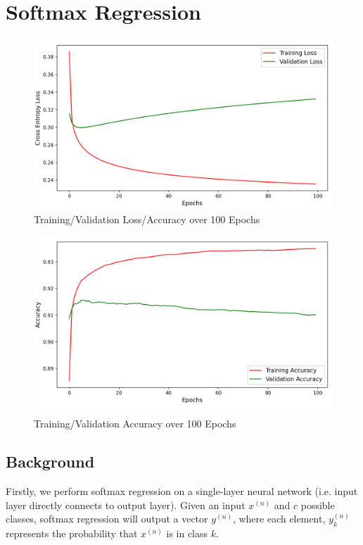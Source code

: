 \section{Softmax Regression}

\begin{figure}[H]
	\centering
	\includegraphics[width=1.0\textwidth]{./images/loss.png}
	\caption{Training/Validation Loss/Accuracy over 100 Epochs}
	\label{fig:loss}
\end{figure}

\begin{figure}[H]
	\centering
	\includegraphics[width=1.0\textwidth]{./images/acc.png}
	\caption{Training/Validation Accuracy over 100 Epochs}
	\label{fig:acc}
\end{figure}

\subsection{Background}
Firstly, we perform softmax regression on a single-layer neural network (i.e.
input layer directly connects to output layer). Given an input $x^{(n)}$ and $c$
possible classes, softmax regression will output a vector $y^{(n)}$, where each
element, $y^{(n)}_k$ represents the probability that $x^{(n)}$ is in class $k$.

